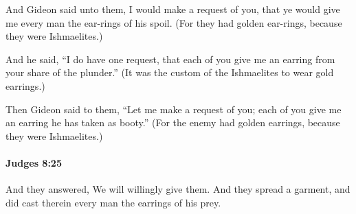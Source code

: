 			\begin{versebox}
					\item[BHS] 
					\item[ASV] And Gideon said unto them, I would make a request of you, that ye would give me every man the ear-rings of his spoil. (For they had golden ear-rings, because they were Ishmaelites.)
					\item[NIV] And he said, “I do have one request, that each of you give me an earring from your share of the plunder.” (It was the custom of the Ishmaelites to wear gold earrings.)
					\item[NRSV] Then Gideon said to them, “Let me make a request of you; each of you give me an earring he has taken as booty.” (For the enemy had golden earrings, because they were Ishmaelites.)
			\end{versebox}

		\paragraph{Judges 8:25} %
			\label{JUDGES-8-25}

			And they answered, We will willingly give them. And they spread a garment, and did cast therein every man the earrings of his prey.

